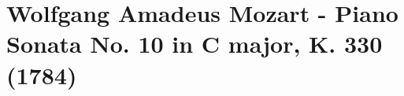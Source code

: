\chapter[Mozart and Piano Sonata No. 10, K. 330]{Wolfgang Amadeus Mozart - Piano Sonata No. 10 in C major, K. 330 (1784)}\label{mozart}
